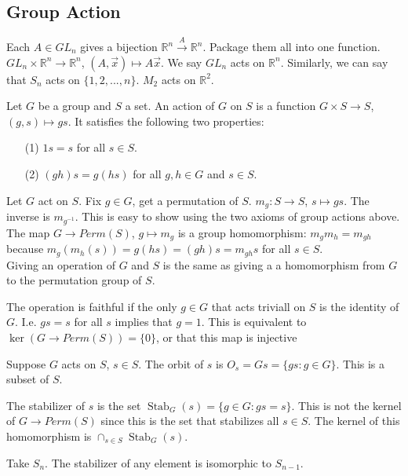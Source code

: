 \documentclass{article}
\newcommand{\R}{\mathbb{R}}
\newcommand{\ra}[1][]{\xrightarrow{#1}}
\DeclareMathOperator{\Stab}{Stab}
\begin{document}
\subsection{Group Action}
Each $A\in GL_n$ gives a bijection $\R^n\ra[A]\R^n$. Package them all into one function. $GL_n\times \R^n\ra\R^n$, $(A,\vec{x})\mapsto A\vec{x}$. We say $GL_n$ acts on $\R^n$. Similarly, we can say that $S_n$ acts on $\{1,2,...,n\}$. $M_2$ acts on $\R^2$.
\begin{definition}
Let $G$ be a group and $S$ a set. An action of $G$ on $S$ is a function $G\times S\ra S$, $(g,s)\mapsto gs$. It satisfies the following two properties:
\begin{enumerate}
    \item[(1)] $1s=s$ for all $s\in S$.
    \item[(2)] $(gh)s=g(hs)$ for all $g,h\in G$ and $s\in S$.
\end{enumerate}
\end{definition}
Let $G$ act on $S$. Fix $g\in G$, get a permutation of $S$. $m_g:S\ra S$, $s\mapsto gs$. The inverse is $m_{g^{-1}}$. This is easy to show using the two axioms of group actions above.\\
The map $G\ra Perm(S)$, $g\mapsto m_g$ is a group homomorphism: $m_gm_h=m_{gh}$ because $m_g(m_h(s))=g(hs)=(gh)s=m_{gh}s$ for all $s\in S$. \\
Giving an operation of $G$ and $S$ is the same as giving a a homomorphism from $G$ to the permutation group of $S$.
\begin{definition}
The operation  is faithful if the only $g\in G$ that acts triviall on $S$ is the identity of $G$. I.e. $gs=s$ for all $s$ implies that $g=1$. This is equivalent to $\ker(G\ra Perm(S))=\{0\}$, or that this map is injective
\end{definition}
\begin{definition}
Suppose $G$ acts on $S$, $s\in S$. The orbit of $s$ is $O_s=Gs=\{gs:g\in G\}$. This is a subset of $S$.
\end{definition}
\begin{definition}
The stabilizer of $s$ is the set $\Stab_G(s)=\{g\in G: gs=s\}$. This is not the kernel of $G\ra Perm(S)$ since this is the set that stabilizes all $s\in S$. The kernel of this homomorphism is $\cap_{s\in S}\Stab_G(s)$.
\end{definition}
\begin{example}
Take $S_n$. The stabilizer of any element is isomorphic to $S_{n-1}$.
\end{example}
\end{document}
